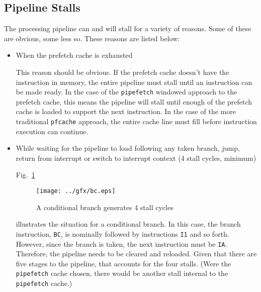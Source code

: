 \documentclass{gqtekspec}
\begin{document}

\subsection{Pipeline Stalls}
The processing pipeline can and will stall for a variety of reasons.  Some of
these are obvious, some less so.  These reasons are listed below:
\begin{itemize}
\item When the prefetch cache is exhausted

This reason should be obvious.  If the prefetch cache doesn't have the
instruction in memory, the entire pipeline must stall until an instruction
can be made ready.  In the case of the {\tt pipefetch} windowed approach
to the prefetch cache, this means the pipeline will stall until enough of the
prefetch cache is loaded to support the next instruction.  In the case
of the more traditional {\tt pfcache} approach, the entire cache line must
fill before instruction execution can continue.

\item While waiting for the pipeline to load following any taken branch, jump,
	return from interrupt or switch to interrupt context (4 stall cycles,
	minimum)

Fig.~\ref{fig:bcstalls}
\begin{figure}\begin{center}
\texttt{[image: ../gfx/bc.eps]}
\caption{A conditional branch generates 4 stall cycles}\label{fig:bcstalls}
\end{center}\end{figure}
illustrates the situation for a conditional branch.  In this case, the branch
instruction, {\tt BC}, is nominally followed by instructions {\tt I1} and so
forth.  However, since the branch is taken, the next instruction must be
{\tt IA}.  Therefore, the pipeline needs to be cleared and reloaded.
Given that there are five stages to the pipeline, that accounts
for the four stalls.  (Were the {\tt pipefetch} cache chosen, there would
be another stall internal to the {\tt pipefetch} cache.)


\end{itemize}
\end{document}
